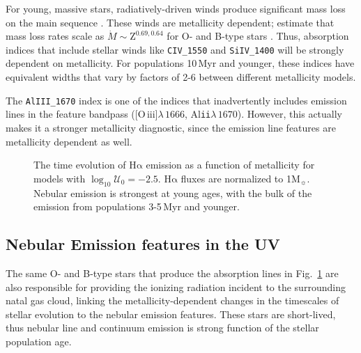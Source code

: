 \documentclass[preprint2]{aastex61}
\newcommand{\oiii}{[O\,{\sc iii}]\xspace}
\newcommand\Msun{\ensuremath{\mathrm{M_{\sun}}}\xspace}
\newcommand{\ha}{\ensuremath{\mathrm{H\alpha}}\xspace}
\newcommand{\Myr}{$\,$Myr\xspace}
\newcommand{\logten}{\ensuremath{\log_{10}}}
\newcommand{\logUeq}[1]{\ensuremath{\logten \mathcal{U}_0 = #1}}
\begin{document}
For young, massive stars, radiatively-driven winds produce significant mass loss on the main sequence \citep{Kudritzki+2000}. These winds are metallicity dependent; \citet{Vink+2001} estimate that mass loss rates scale as $\dot{M}\sim\mathrm{Z}^{0.69,0.64}$ for O- and B-type stars \citep{Vink+2001}. Thus, absorption indices that include stellar winds like \texttt{CIV\_1550} and \texttt{SiIV\_1400} will be strongly dependent on metallicity. For populations 10\Myr and younger, these indices have equivalent widths that vary by factors of 2-6 between different metallicity models. 

The \texttt{AlIII\_1670} index is one of the indices that inadvertently includes emission lines in the feature bandpass (\oiii$\lambda\,1666$, Al\texttt{ii}$\lambda\,1670$). However, this actually makes it a stronger metallicity diagnostic, since the emission line features are metallicity dependent as well.

\begin{figure}
  \begin{center}
    \caption{The time evolution of \ha emission as a function of metallicity for models with \logUeq{-2.5}. \ha fluxes are normalized to 1\Msun. Nebular emission is strongest at young ages, with the bulk of the emission from populations 3-5\Myr and younger.}
    \label{fig:EmTimeEvol}
  \end{center}
\end{figure}

\subsection{Nebular Emission features in the UV}\label{sec:mod:em}

The same O- and B-type stars that produce the absorption lines in Fig.~\ref{fig:EmTimeEvol} are also responsible for providing the ionizing radiation incident to the surrounding natal gas cloud, linking the metallicity-dependent changes in the timescales of stellar evolution to the nebular emission features. These stars are short-lived, thus nebular line and continuum emission is strong function of the stellar population age.
\end{document}
